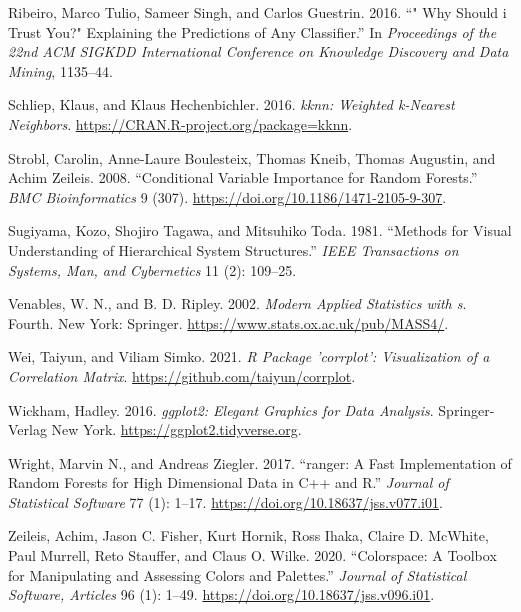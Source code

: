 \begin{CSLReferences}{1}{0}
\leavevmode{}%
Ribeiro, Marco Tulio, Sameer Singh, and Carlos Guestrin. 2016. {``" Why Should i Trust You?" Explaining the Predictions of Any Classifier.''} In \emph{Proceedings of the 22nd ACM SIGKDD International Conference on Knowledge Discovery and Data Mining}, 1135--44.

\leavevmode{}%
Schliep, Klaus, and Klaus Hechenbichler. 2016. \emph{{kknn}: Weighted k-Nearest Neighbors}. \url{https://CRAN.R-project.org/package=kknn}.

\leavevmode{}%
Strobl, Carolin, Anne-Laure Boulesteix, Thomas Kneib, Thomas Augustin, and Achim Zeileis. 2008. {``Conditional Variable Importance for Random Forests.''} \emph{BMC Bioinformatics} 9 (307). \url{https://doi.org/10.1186/1471-2105-9-307}.

\leavevmode{}%
Sugiyama, Kozo, Shojiro Tagawa, and Mitsuhiko Toda. 1981. {``Methods for Visual Understanding of Hierarchical System Structures.''} \emph{IEEE Transactions on Systems, Man, and Cybernetics} 11 (2): 109--25.

\leavevmode{}%
Venables, W. N., and B. D. Ripley. 2002. \emph{Modern Applied Statistics with s}. Fourth. New York: Springer. \url{https://www.stats.ox.ac.uk/pub/MASS4/}.

\leavevmode{}%
Wei, Taiyun, and Viliam Simko. 2021. \emph{R Package '{corrplot}': Visualization of a Correlation Matrix}. \url{https://github.com/taiyun/corrplot}.

\leavevmode{}%
Wickham, Hadley. 2016. \emph{{ggplot2}: Elegant Graphics for Data Analysis}. Springer-Verlag New York. \url{https://ggplot2.tidyverse.org}.

\leavevmode{}%
Wright, Marvin N., and Andreas Ziegler. 2017. {``{ranger}: A Fast Implementation of Random Forests for High Dimensional Data in {C++} and {R}.''} \emph{Journal of Statistical Software} 77 (1): 1--17. \url{https://doi.org/10.18637/jss.v077.i01}.

\leavevmode{}%
Zeileis, Achim, Jason C. Fisher, Kurt Hornik, Ross Ihaka, Claire D. McWhite, Paul Murrell, Reto Stauffer, and Claus O. Wilke. 2020. {``Colorspace: A Toolbox for Manipulating and Assessing Colors and Palettes.''} \emph{Journal of Statistical Software, Articles} 96 (1): 1--49. \url{https://doi.org/10.18637/jss.v096.i01}.

\end{CSLReferences}


